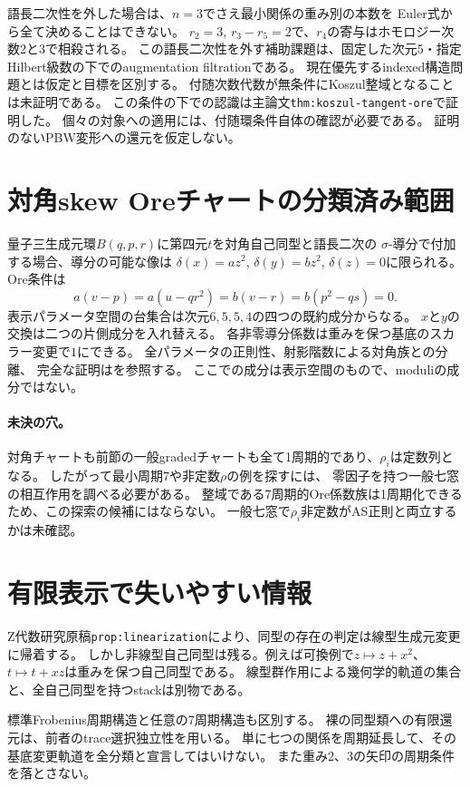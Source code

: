 \documentclass[11pt,a4paper]{ltjsarticle}
\begin{document}
語長二次性を外した場合は、$n=3$でさえ最小関係の重み別の本数を
Euler式から全て決めることはできない。
$r_2=3$, $r_3-r_5=2$で、$r_4$の寄与はホモロジー次数2と3で相殺される。
この語長二次性を外す補助課題は、固定した次元5・指定Hilbert級数の下でのaugmentation filtrationである。
現在優先するindexed構造問題とは仮定と目標を区別する。
付随次数代数が無条件にKoszul整域となることは未証明である。
この条件の下での認識は主論文\texttt{thm:koszul-tangent-ore}で証明した。
個々の対象への適用には、付随環条件自体の確認が必要である。
証明のないPBW変形への還元を仮定しない。

\section{対角skew Oreチャートの分類済み範囲}
量子三生成元環$B(q,p,r)$に第四元$t$を対角自己同型と語長二次の
$\sigma$-導分で付加する場合、導分の可能な像は
$\delta(x)=az^2$, $\delta(y)=bz^2$, $\delta(z)=0$に限られる。
Ore条件は
\[
a(v-p)=a(u-qr^2)=b(v-r)=b(p^2-qs)=0.
\]
表示パラメータ空間の台集合は次元$6,5,5,4$の四つの既約成分からなる。
$x$と$y$の交換は二つの片側成分を入れ替える。
各非零導分係数は重みを保つ基底のスカラー変更で$1$にできる。
全パラメータの正則性、射影階数による対角族との分離、
完全な証明はを参照する。
ここでの成分は表示空間のもので、moduliの成分ではない。
\paragraph{未決の穴。}
対角チャートも前節の一般gradedチャートも全て1周期的であり、$\rho_i$は定数列となる。
したがって最小周期7や非定数$\rho$の例を探すには、
零因子を持つ一般七窓の相互作用を調べる必要がある。
整域である7周期的Ore係数族は1周期化できるため、この探索の候補にはならない。
一般七窓で$\rho_i$非定数がAS正則と両立するかは未確認。
\section{有限表示で失いやすい情報}
Z代数研究原稿\texttt{prop:linearization}により、同型の存在の判定は線型生成元変更に帰着する。
しかし非線型自己同型は残る。例えば可換例で$z\mapsto z+x^2$、
$t\mapsto t+xz$は重みを保つ自己同型である。
線型群作用による幾何学的軌道の集合と、全自己同型を持つstackは別物である。

標準Frobenius周期構造と任意の7周期構造も区別する。
裸の同型類への有限還元は、前者のtrace選択独立性を用いる。
単に七つの関係を周期延長して、その基底変更軌道を全分類と宣言してはいけない。
また重み2、3の矢印の周期条件を落とさない。
\end{document}
